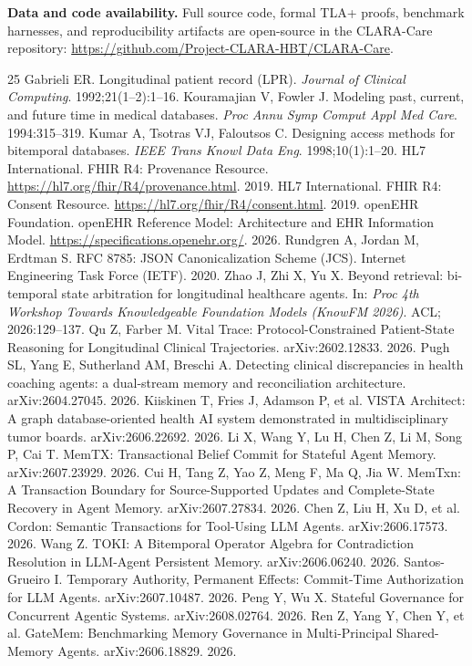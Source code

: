 \documentclass[11pt,a4paper]{article}
\begin{document}
\textbf{Data and code availability.} Full source code, formal TLA+ proofs, benchmark harnesses, and reproducibility artifacts are open-source in the CLARA-Care repository: \url{https://github.com/Project-CLARA-HBT/CLARA-Care}.

\begin{thebibliography}{25}
 Gabrieli ER. Longitudinal patient record (LPR). \emph{Journal of Clinical Computing}. 1992;21(1--2):1--16.
 Kouramajian V, Fowler J. Modeling past, current, and future time in medical databases. \emph{Proc Annu Symp Comput Appl Med Care}. 1994:315--319.
 Kumar A, Tsotras VJ, Faloutsos C. Designing access methods for bitemporal databases. \emph{IEEE Trans Knowl Data Eng}. 1998;10(1):1--20.
 HL7 International. FHIR R4: Provenance Resource. \url{https://hl7.org/fhir/R4/provenance.html}. 2019.
 HL7 International. FHIR R4: Consent Resource. \url{https://hl7.org/fhir/R4/consent.html}. 2019.
 openEHR Foundation. openEHR Reference Model: Architecture and EHR Information Model. \url{https://specifications.openehr.org/}. 2026.
 Rundgren A, Jordan M, Erdtman S. RFC 8785: JSON Canonicalization Scheme (JCS). Internet Engineering Task Force (IETF). 2020.
 Zhao J, Zhi X, Yu X. Beyond retrieval: bi-temporal state arbitration for longitudinal healthcare agents. In: \emph{Proc 4th Workshop Towards Knowledgeable Foundation Models (KnowFM 2026)}. ACL; 2026:129--137.
 Qu Z, Farber M. Vital Trace: Protocol-Constrained Patient-State Reasoning for Longitudinal Clinical Trajectories. arXiv:2602.12833. 2026.
 Pugh SL, Yang E, Sutherland AM, Breschi A. Detecting clinical discrepancies in health coaching agents: a dual-stream memory and reconciliation architecture. arXiv:2604.27045. 2026.
 Kiiskinen T, Fries J, Adamson P, et al. VISTA Architect: A graph database-oriented health AI system demonstrated in multidisciplinary tumor boards. arXiv:2606.22692. 2026.
 Li X, Wang Y, Lu H, Chen Z, Li M, Song P, Cai T. MemTX: Transactional Belief Commit for Stateful Agent Memory. arXiv:2607.23929. 2026.
 Cui H, Tang Z, Yao Z, Meng F, Ma Q, Jia W. MemTxn: A Transaction Boundary for Source-Supported Updates and Complete-State Recovery in Agent Memory. arXiv:2607.27834. 2026.
 Chen Z, Liu H, Xu D, et al. Cordon: Semantic Transactions for Tool-Using LLM Agents. arXiv:2606.17573. 2026.
 Wang Z. TOKI: A Bitemporal Operator Algebra for Contradiction Resolution in LLM-Agent Persistent Memory. arXiv:2606.06240. 2026.
 Santos-Grueiro I. Temporary Authority, Permanent Effects: Commit-Time Authorization for LLM Agents. arXiv:2607.10487. 2026.
 Peng Y, Wu X. Stateful Governance for Concurrent Agentic Systems. arXiv:2608.02764. 2026.
 Ren Z, Yang Y, Chen Y, et al. GateMem: Benchmarking Memory Governance in Multi-Principal Shared-Memory Agents. arXiv:2606.18829. 2026.
\end{thebibliography}
\end{document}
